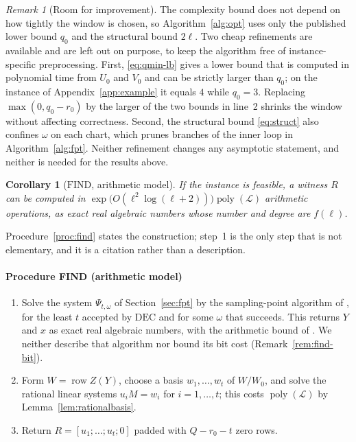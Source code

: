 \documentclass[journal]{IEEEtran}
\theoremstyle{plainn}
\newtheorem{cor}[thm]{Corollary}
\theoremstyle{remark}
\newtheorem{remark}{Remark}
\begin{document}
\begin{remark}[Room for improvement]\label{rem:refine}
The complexity bound does not depend on how tightly the window is chosen, so
Algorithm~\ref{alg:opt} uses only the published lower bound $q_0$ and the structural bound $2\ell$.
Two cheap refinements are available and are left out on purpose, to keep the algorithm free of
instance-specific preprocessing. First, \eqref{eq:qmin-lb} gives a lower bound that is computed in
polynomial time from $U_0$ and $V_0$ and can be strictly larger than $q_0$; on the instance of
Appendix~\ref{app:example} it equals $4$ while $q_0=3$. Replacing $\max(0,q_0-r_0)$ by the larger of
the two bounds in line~2 shrinks the window without affecting correctness. Second, the structural
bound \eqref{eq:struct} also confines $\omega$ on each chart, which prunes branches of the inner loop
in Algorithm~\ref{alg:fpt}. Neither refinement changes any asymptotic statement, and neither is
needed for the results above.
\end{remark}

\begin{cor}[$\mathrm{FIND}$, arithmetic model]\label{cor:find}
If the instance is feasible, a witness $R$ can be computed in
$\exp\bigl(O(\ell^2\log(\ell+2))\bigr)\operatorname{poly}(\mathcal L)$ arithmetic operations, as
exact real algebraic numbers whose number and degree are $f(\ell)$.
\end{cor}

Procedure~\ref{proc:find} states the construction; step~1 is the only step that is not elementary,
and it is a citation rather than a description.

\paragraph*{Procedure FIND (arithmetic model)}\label{proc:find}
\begin{enumerate}
\item Solve the system $\Psi_{t,\omega}$ of Section~\ref{sec:fpt} by the sampling-point algorithm of
\cite[Ch.~13]{bpr06}, for the least $t$ accepted by $\mathrm{DEC}$ and for some $\omega$ that
succeeds. This returns $Y$ and $x$ as exact real algebraic numbers, with the arithmetic bound of
\cite[Ch.~13]{bpr06}. We neither describe that algorithm nor bound its bit cost
(Remark~\ref{rem:find-bit}).
\item Form $W=\operatorname{row}Z(Y)$, choose a basis $w_1,\dots,w_t$ of $W/W_0$, and solve the
rational linear systems $u_iM=w_i$ for $i=1,\dots,t$; this costs $\operatorname{poly}(\mathcal L)$ by
Lemma~\ref{lem:rationalbasis}.
\item Return $R=[u_1;\dots;u_t;0]$ padded with $Q-r_0-t$ zero rows.
\end{enumerate}
\end{document}
